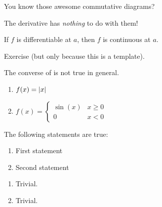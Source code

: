 \documentclass[10pt]{extarticle}
\makeatletter
\newcommand{\<}{\langle}
\renewcommand{\>}{\rangle}
\renewenvironment{proof}[1][\proofname] {\par\pushQED{\qed}{\normalfont\sffamily\bfseries\topsep6\p@\@plus6\p@\relax #1\@addpunct{.} }}{\popQED\endtrivlist\@endpefalse}
\theoremstyle{mystyle}{\newtheorem{definition}{Definition}[section]}
\theoremstyle{mystyle}{\newtheorem{proposition}[definition]{Proposition}}
\theoremstyle{mystyle}{\newtheorem{theorem}[definition]{Theorem}}
\theoremstyle{mystyle}{\newtheorem{lemma}[definition]{Lemma}}
\theoremstyle{mystyle}{\newtheorem{corollary}[definition]{Corollary}}
\theoremstyle{mystyle}{\newtheorem*{remark}{Remark}}
\theoremstyle{mystyle}{\newtheorem*{remarks}{Remarks}}
\theoremstyle{mystyle}{\newtheorem*{example}{Example}}
\theoremstyle{mystyle}{\newtheorem*{examples}{Examples}}
\theoremstyle{definition}{\newtheorem*{exercise}{Exercise}}
\theoremstyle{cstyle}{\newtheorem*{cthm}{}}
\theoremstyle{warn}
\makeatother
\begin{document}
\begin{center}
You know those awesome commutative diagrams?


The derivative has \emph{nothing} to do with them!
\end{center}

\begin{proposition}\label{diffcont}
If $f$ is differentiable at $a$, then $f$ is continuous at $a$.
\end{proposition}
\begin{proof}
Exercise (but only because this is a template).
\end{proof}

The converse of  is not true in general.

\begin{examples}\leavevmode %
\begin{enumerate}
    \item $f(x)=\abs{x}$
    \item $f(x)=\begin{cases} \sin(x) & x\ge 0 \\ 0 & x<0 \end{cases}$
\end{enumerate}
\end{examples}

\begin{theorem}
The following statements are true:
\begin{enumerate}
    \item First statement
    \item Second statement
\end{enumerate}
\end{theorem}
\begin{proof}%
\begin{enumerate}
    \item Trivial.
    \item Trivial.\qedhere %
\end{enumerate}
\end{proof}
\end{document}
